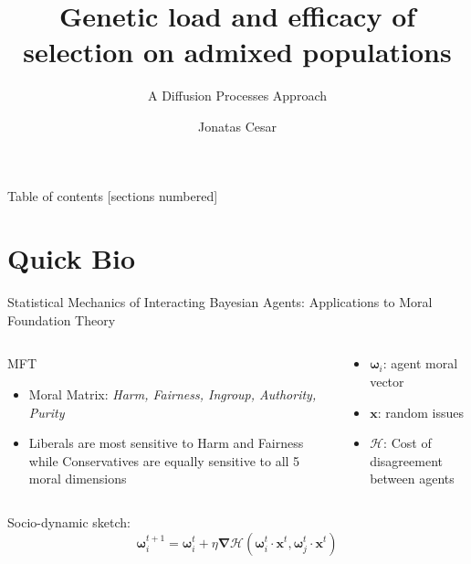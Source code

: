 \documentclass[10pt]{beamer}
\title{Genetic load and efficacy of selection on admixed populations}
\subtitle{A Diffusion Processes Approach}
\date{}
\author{Jonatas Cesar}
\institute{University of S\~ao Paulo \& University of Chicago}
\begin{document}
\maketitle

\begin{frame}{Table of contents}
  [sections numbered]
  \tableofcontents[hideallsubsections]
\end{frame}

\section{Quick Bio}

\begin{frame}{\normalsize Statistical Mechanics of Interacting Bayesian Agents: Applications
    to Moral Foundation Theory}
  
  \footnotesize
  \begin{columns}
    \begin{column}{0.65\textwidth}
      \begin{alertblock}{MFT}
        \begin{itemize}
          \item Moral Matrix: \textit{Harm, Fairness, Ingroup, Authority, Purity}
          \item Liberals are most sensitive to Harm and Fairness while
            Conservatives are equally sensitive to all 5 moral dimensions
        \end{itemize}
      \end{alertblock}
    \end{column}
    \begin{column}{0.45\textwidth}
      \begin{itemize}
          \item $\bm \omega_i$: agent moral vector 
          \item $\bm x$: random issues 
          \item $\mathcal H$: Cost of disagreement between agents
      \end{itemize}
    \end{column}
  \end{columns}
  \centering 
  Socio-dynamic sketch:
  \[
    \bm \omega_i^{t + 1} = \bm \omega_i^{t} + 
    \eta \bm \nabla 
    \mathcal H (\bm \omega_i^t \cdot \bm x ^t, \bm \omega_j^t \cdot \bm x ^t)
  \]


\end{frame}
\end{document}
